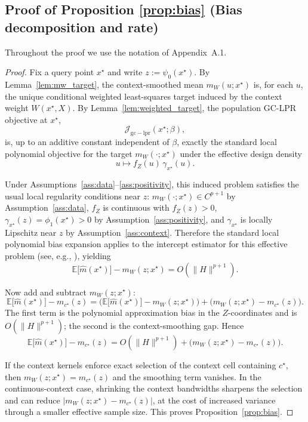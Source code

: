 \documentclass[final,1p,times,authoryear]{elsarticle}
\newcommand{\Jcal}{\mathcal{J}}
\begin{document}
\subsection{Proof of Proposition \ref{prop:bias} (Bias decomposition and rate)}
\label{app:proof_bias}
Throughout the proof we use the notation of Appendix~A.1.

\begin{proof}
Fix a query point $x^\star$ and write $z:=\psi_0(x^\star)$.
By Lemma~\ref{lem:mw_target}, the context-smoothed mean \(m_W(u;x^\star)\) is, for each \(u\), the unique conditional weighted least-squares target induced by the context weight \(W(x^\star,X)\). By Lemma~\ref{lem:weighted_target}, the population GC-LPR objective at \(x^\star\),
\[
\Jcal_{\mathrm{gc-lpr}}(x^\star;\beta),
\]
is, up to an additive constant independent of \(\beta\), exactly the standard local polynomial objective for the target \(m_W(\cdot;x^\star)\) under the effective design density
\[
u\mapsto f_Z(u)\,\gamma_{x^\star}(u).
\]

Under Assumptions~\ref{ass:data}--\ref{ass:positivity}, this induced problem satisfies the usual local regularity conditions near \(z\): \(m_W(\cdot;x^\star)\in C^{p+1}\) by Assumption~\ref{ass:data}, \(f_Z\) is continuous with \(f_Z(z)>0\), \(\gamma_{x^\star}(z)=\phi_1(x^\star)>0\) by Assumption~\ref{ass:positivity}, and \(\gamma_{x^\star}\) is locally Lipschitz near \(z\) by Assumption~\ref{ass:context}. Therefore the standard local polynomial bias expansion applies to the intercept estimator for this effective problem (see, e.g., \cite{fan1996local,loader1999local}), yielding
\[
\mathbb{E}\big[\hat m(x^\star)\big]-m_W(z;x^\star)
=O(\|H\|^{p+1}).
\]

Now add and subtract \(m_W(z;x^\star)\):
\[
\mathbb{E}\big[\hat m(x^\star)\big]-m_{c^\star}(z)
=
\Big(\mathbb{E}\big[\hat m(x^\star)\big]-m_W(z;x^\star)\Big)
+
\Big(m_W(z;x^\star)-m_{c^\star}(z)\Big).
\]
The first term is the polynomial approximation bias in the \(Z\)-coordinates and is \(O(\|H\|^{p+1})\); the second is the context-smoothing gap. Hence
\[
\mathbb{E}\big[\hat m(x^\star)\big]-m_{c^\star}(z)
=
O(\|H\|^{p+1})+\Big(m_W(z;x^\star)-m_{c^\star}(z)\Big).
\]

If the context kernels enforce exact selection of the context cell containing \(c^\star\), then \(m_W(z;x^\star)=m_{c^\star}(z)\) and the smoothing term vanishes. In the continuous-context case, shrinking the context bandwidths sharpens the selection and can reduce \(\big|m_W(z;x^\star)-m_{c^\star}(z)\big|\), at the cost of increased variance through a smaller effective sample size. This proves Proposition~\ref{prop:bias}.
\end{proof}
\end{document}
